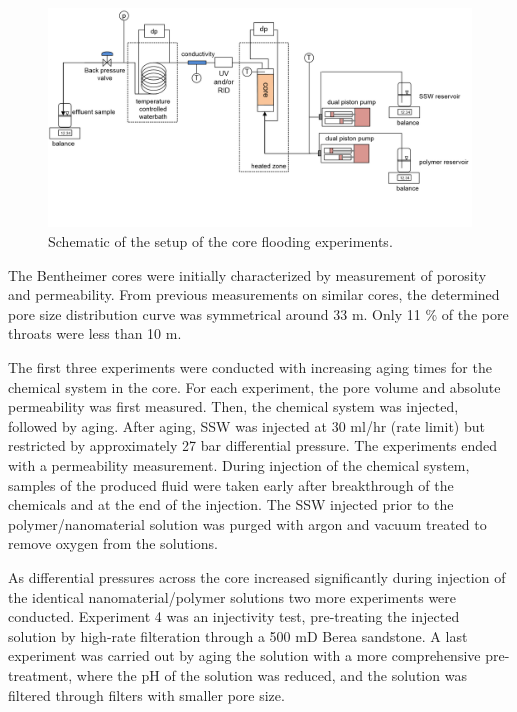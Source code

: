 \documentclass[nanomaterials,article,submit,moreauthors,pdftex]{Definitions/mdpi}
\begin{document}
\begin{figure}[h!]
        \includegraphics[width=\textwidth]{fig/experimentalSetup.png}
        \caption{Schematic of the setup of the core flooding experiments.}
        \label{fig:experimentalSetup}
\end{figure}

The Bentheimer cores were initially characterized by measurement of porosity and permeability. From previous measurements on similar cores, the determined pore size distribution curve was symmetrical around 33 \micro m. Only 11 \% of the pore throats were less than 10 \micro m.


The first three experiments were conducted with increasing aging times for the chemical system in the core. For each experiment, the pore volume and absolute permeability was first measured. Then, the chemical system was injected, followed by aging. After aging, SSW was injected at 30 ml/hr (rate limit) but restricted by approximately 27 bar differential pressure. The experiments ended with a permeability measurement. During injection of the chemical system, samples of the produced fluid were taken early after breakthrough of the chemicals and at the end of the injection. The SSW injected prior to the polymer/nanomaterial solution was purged with argon and vacuum treated to remove oxygen from the solutions.

As differential pressures across the core increased significantly during injection of the identical nanomaterial/polymer solutions two more experiments were conducted. Experiment 4 was an injectivity test, pre-treating the injected solution by high-rate filteration through a 500 mD Berea sandstone. A last experiment was carried out by aging the solution with a more comprehensive pre-treatment, where the pH of the solution was reduced, and the solution was filtered through filters with smaller pore size.
\end{document}
